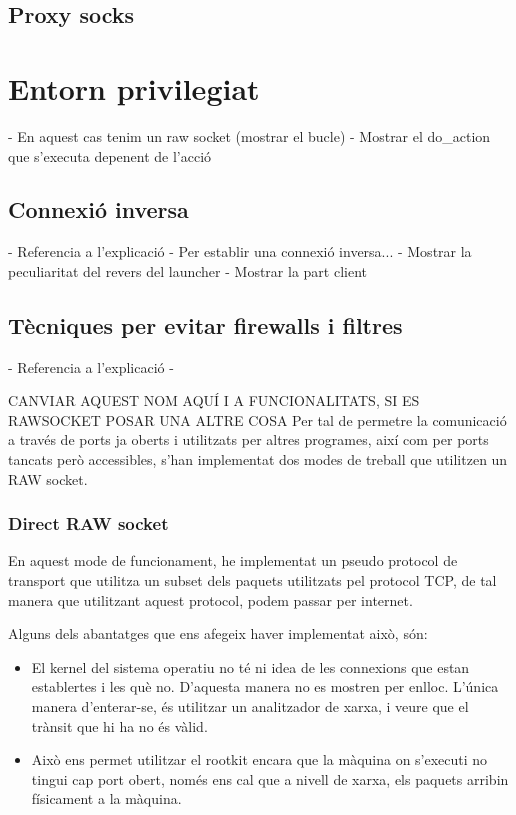 \subsection{Proxy socks}



\section{Entorn privilegiat}
- En aquest cas tenim un raw socket (mostrar el bucle) 
- Mostrar el do\_action que s'executa depenent de l'acció
\subsection{Connexió inversa}
- Referencia a l'explicació
- Per establir una connexió inversa...
- Mostrar la peculiaritat del revers del launcher
- Mostrar la part client

\subsection{Tècniques per evitar firewalls i filtres}
- Referencia a l'explicació
- 

CANVIAR AQUEST NOM AQUÍ I A FUNCIONALITATS, SI ES RAWSOCKET POSAR UNA ALTRE COSA
Per tal de permetre la comunicació a través de ports ja oberts i utilitzats per altres programes, així com per ports tancats però accessibles, s'han
implementat dos modes de treball que utilitzen un RAW socket.

\subsubsection{Direct RAW socket}
En aquest mode de funcionament, he implementat un pseudo protocol de transport que utilitza un subset dels paquets utilitzats pel protocol TCP, de tal
manera que utilitzant aquest protocol, podem passar per internet. 

Alguns dels abantatges que ens afegeix haver implementat això, són:
\begin{itemize}
\item El kernel del sistema operatiu no té ni idea de les connexions que estan establertes i les què no. D'aquesta manera no es mostren per
enlloc. L'única manera d'enterar-se, és utilitzar un analitzador de xarxa, i veure que el trànsit que hi ha no és vàlid.
\item Això ens permet utilitzar el rootkit encara que la màquina on s'executi no tingui cap port obert, només ens cal que a nivell de xarxa, 
els paquets arribin físicament a la màquina.
\end{itemize}

